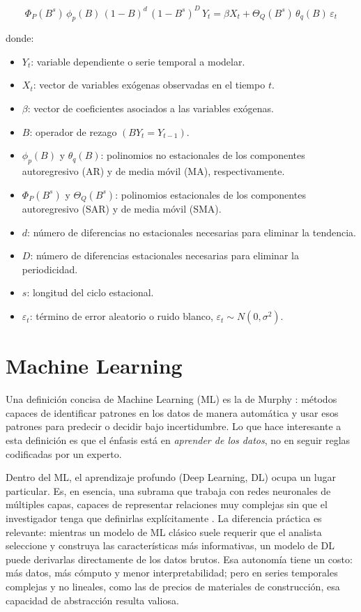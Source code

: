 \begin{equation}
 \Phi_P(B^s)\,\phi_p(B)\,(1 - B)^d\,(1 - B^s)^D\,Y_t
 = \beta X_t + \Theta_Q(B^s)\,\theta_q(B)\,\varepsilon_t
\end{equation}

\justify
donde:
\begin{itemize}
\item $Y_t$: variable dependiente o serie temporal a modelar.
\item $X_t$: vector de variables exógenas observadas en el tiempo $t$.
\item $\beta$: vector de coeficientes asociados a las variables exógenas.
\item $B$: operador de rezago $(B Y_t = Y_{t-1})$.
\item $\phi_p(B)$ y $\theta_q(B)$: polinomios no estacionales de los componentes autoregresivo (AR) y de media móvil (MA), respectivamente.
\item $\Phi_P(B^s)$ y $\Theta_Q(B^s)$: polinomios estacionales de los componentes autoregresivo (SAR) y de media móvil (SMA).
\item $d$: número de diferencias no estacionales necesarias para eliminar la tendencia.
\item $D$: número de diferencias estacionales necesarias para eliminar la periodicidad.
\item $s$: longitud del ciclo estacional.
\item $\varepsilon_t$: término de error aleatorio o ruido blanco, $\varepsilon_t \sim N(0, \sigma^2)$.
\end{itemize}

\section{Machine Learning}
\justify
Una definición concisa de Machine Learning (ML) es la de Murphy \cite{murphy2012machine}: métodos capaces de identificar patrones en los datos de manera automática y usar esos patrones para predecir o decidir bajo incertidumbre. Lo que hace interesante a esta definición es que el énfasis está en \textit{aprender de los datos}, no en seguir reglas codificadas por un experto.

\justify
Dentro del ML, el aprendizaje profundo (Deep Learning, DL) ocupa un lugar particular. Es, en esencia, una subrama que trabaja con redes neuronales de múltiples capas, capaces de representar relaciones muy complejas sin que el investigador tenga que definirlas explícitamente \cite{chollet2021deep}. La diferencia práctica es relevante: mientras un modelo de ML clásico suele requerir que el analista seleccione y construya las características más informativas, un modelo de DL puede derivarlas directamente de los datos brutos. Esa autonomía tiene un costo: más datos, más cómputo y menor interpretabilidad; pero en series temporales complejas y no lineales, como las de precios de materiales de construcción, esa capacidad de abstracción resulta valiosa.

